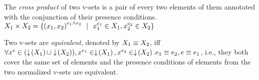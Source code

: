 \begin{definition} 
\label{def:vset-cross}
The \emph{cross product} of two v-sets is a pair of every two elements of 
them annotated with the conjunction of their presence conditions.
\ensuremath{
\vset_1 \times \vset_2 = \setDef{
\annot [\dimMeta_1 \wedge \dimMeta_2] {(\elem_1, \elem_2)} \myOR
\annot [\dimMeta_1] \elem_1 \in \vset_1, \annot [\dimMeta_2] \elem_2 \in \vset_2
}
}
%
\end{definition}

\begin{definition} 
\label{def:vset-eq}
Two v-sets are \emph{equivalent}, denoted by
\ensuremath{\vset_1 \equiv \vset_2}, iff
\ensuremath{\forall \annot  \elem \in (\filterSet {\vset_1} \cup \filterSet {\vset_2}),
\annot [\dimMeta_1] \elem \in \filterSet {\vset_1}, \annot [\dimMeta_2] \elem \in \filterSet {\vset_2}.
\dimMeta_1 \equiv \dimMeta_2, \dimMeta \equiv \dimMeta_1},
i.e., they both cover the same set of elements and the presence conditions
of elements from the two normalized v-sets are equivalent.
\end{definition}

%

